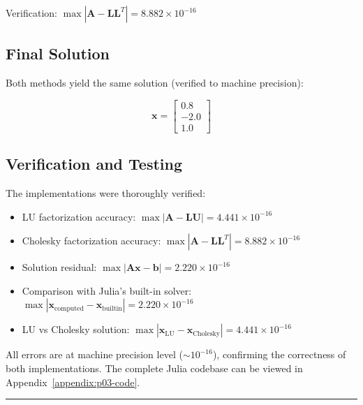 \noindent Verification: $\max|\mathbf{A} - \mathbf{LL}^T| = 8.882 \times 10^{-16}$

\subsection*{Final Solution}

Both methods yield the same solution (verified to machine precision):

$$\boxed{\mathbf{x} = \begin{bmatrix}
0.8 \\
-2.0 \\
1.0
\end{bmatrix}}$$

\subsection*{Verification and Testing}

The implementations were thoroughly verified:
\begin{itemize}
    \item LU factorization accuracy: $\max|\mathbf{A} - \mathbf{LU}| = 4.441 \times 10^{-16}$
    \item Cholesky factorization accuracy: $\max|\mathbf{A} - \mathbf{LL}^T| = 8.882 \times 10^{-16}$
    \item Solution residual: $\max|\mathbf{Ax} - \mathbf{b}| = 2.220 \times 10^{-16}$
    \item Comparison with Julia's built-in solver: $\max|\mathbf{x}_{\text{computed}} - \mathbf{x}_{\text{builtin}}| = 2.220 \times 10^{-16}$
    \item LU vs Cholesky solution: $\max|\mathbf{x}_{\text{LU}} - \mathbf{x}_{\text{Cholesky}}| = 4.441 \times 10^{-16}$
\end{itemize}

All errors are at machine precision level ($\sim 10^{-16}$), confirming the correctness of both implementations. The complete Julia codebase can be viewed in Appendix~\ref{appendix:p03-code}.

\vspace{2em}
\noindent\rule{\textwidth}{0.4pt}
